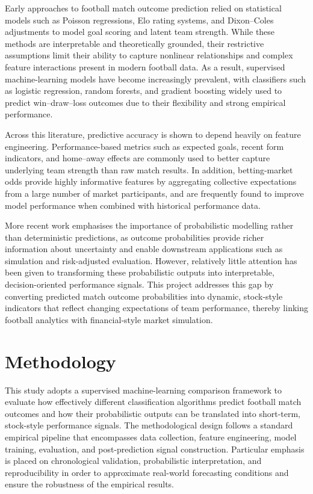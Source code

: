 \documentclass[11pt,a4paper]{article}
\begin{document}
Early approaches to football match outcome prediction relied on statistical models such as Poisson regressions, Elo rating systems, and Dixon–Coles adjustments to model goal scoring and latent team strength. While these methods are interpretable and theoretically grounded, their restrictive assumptions limit their ability to capture nonlinear relationships and complex feature interactions present in modern football data. As a result, supervised machine-learning models have become increasingly prevalent, with classifiers such as logistic regression, random forests, and gradient boosting widely used to predict win–draw–loss outcomes due to their flexibility and strong empirical performance.

Across this literature, predictive accuracy is shown to depend heavily on feature engineering. Performance-based metrics such as expected goals, recent form indicators, and home–away effects are commonly used to better capture underlying team strength than raw match results. In addition, betting-market odds provide highly informative features by aggregating collective expectations from a large number of market participants, and are frequently found to improve model performance when combined with historical performance data.

More recent work emphasises the importance of probabilistic modelling rather than deterministic predictions, as outcome probabilities provide richer information about uncertainty and enable downstream applications such as simulation and risk-adjusted evaluation. However, relatively little attention has been given to transforming these probabilistic outputs into interpretable, decision-oriented performance signals. This project addresses this gap by converting predicted match outcome probabilities into dynamic, stock-style indicators that reflect changing expectations of team performance, thereby linking football analytics with financial-style market simulation.


\section{Methodology}
\label{sec:methodology}

This study adopts a supervised machine-learning comparison framework to evaluate how effectively different classification algorithms predict football match outcomes and how their probabilistic outputs can be translated into short-term, stock-style performance signals. The methodological design follows a standard empirical pipeline that encompasses data collection, feature engineering, model training, evaluation, and post-prediction signal construction. Particular emphasis is placed on chronological validation, probabilistic interpretation, and reproducibility in order to approximate real-world forecasting conditions and ensure the robustness of the empirical results.
\end{document}
